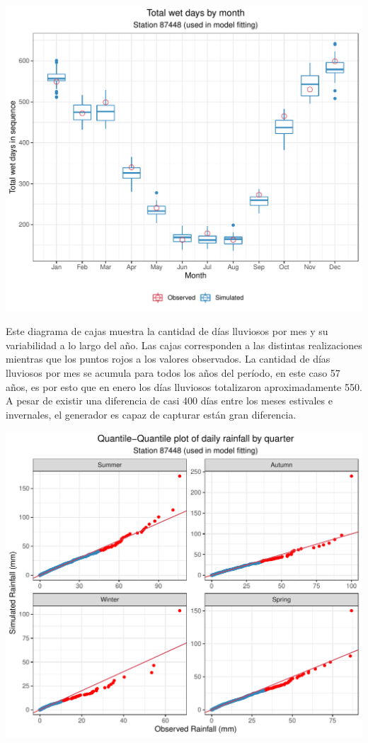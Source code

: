 \documentclass[
]{article}
\begin{document}
\begin{center}\includegraphics{Webinario_Generador_files/figure-latex/unnamed-chunk-33-1} \end{center}

Este diagrama de cajas muestra la cantidad de días lluviosos por mes y su variabilidad a lo largo del año. Las cajas corresponden a las distintas realizaciones mientras que los puntos rojos a los valores observados. La cantidad de días lluviosos por mes se acumula para todos los años del período, en este caso 57 años, es por esto que en enero los días lluviosos totalizaron aproximadamente 550. A pesar de existir una diferencia de casi 400 días entre los meses estivales e invernales, el generador es capaz de capturar están gran diferencia.

\begin{center}\includegraphics{Webinario_Generador_files/figure-latex/unnamed-chunk-34-1} \end{center}
\end{document}
